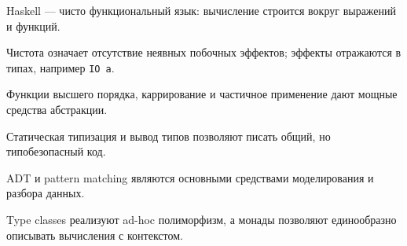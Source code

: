 \begin{important}
    \item Haskell --- чисто функциональный язык: вычисление строится вокруг выражений и функций.
    \item Чистота означает отсутствие неявных побочных эффектов; эффекты отражаются в типах, например \texttt{IO a}.
    \item Функции высшего порядка, каррирование и частичное применение дают мощные средства абстракции.
    \item Статическая типизация и вывод типов позволяют писать общий, но типобезопасный код.
    \item ADT и pattern matching являются основными средствами моделирования и разбора данных.
    \item Type classes реализуют ad-hoc полиморфизм, а монады позволяют единообразно описывать вычисления с контекстом.
\end{important}
